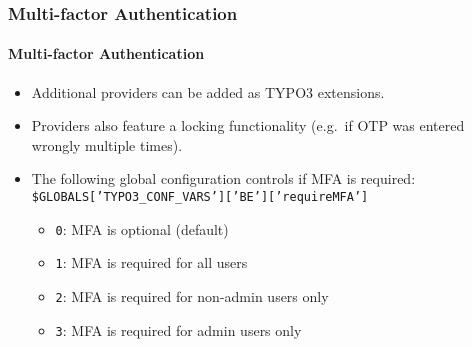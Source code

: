 %

\begin{frame}[fragile]
	\frametitle{Multi-factor Authentication}
	\framesubtitle{Multi-factor Authentication}

	\begin{itemize}

		\item Additional providers can be added as TYPO3 extensions.

		\item Providers also feature a locking functionality
			(e.g.\ if OTP was entered wrongly multiple times).

		\item The following global configuration controls if MFA is required:\newline
			\smaller\texttt{\$GLOBALS['TYPO3\_CONF\_VARS']['BE']['requireMFA']}\normalsize

			\begin{itemize}
				\item \texttt{0}: MFA is optional (default)
				\item \texttt{1}: MFA is required for all users
				\item \texttt{2}: MFA is required for non-admin users only
				\item \texttt{3}: MFA is required for admin users only
			\end{itemize}

	\end{itemize}

\end{frame}

